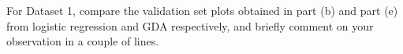 \item {}
For Dataset 1, compare the validation set plots obtained in part (b) and part (e)
from logistic regression and GDA respectively, and briefly comment on your observation
in a couple of lines.

